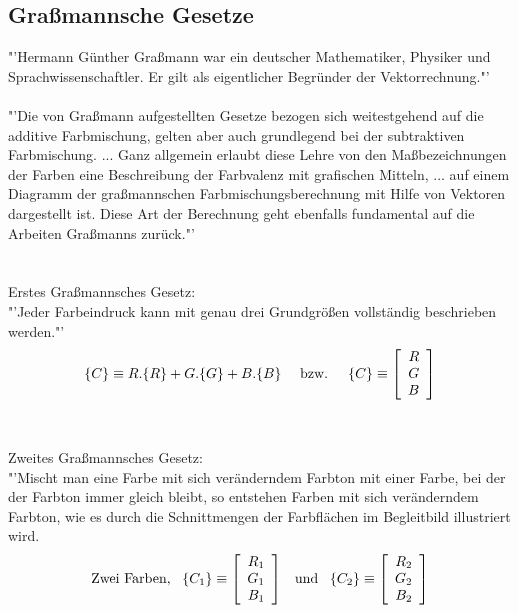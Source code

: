 \documentclass[11pt]{scrartcl}
\begin{document}
\subsection{Graßmannsche Gesetze}
"'Hermann Günther Graßmann war ein deutscher Mathematiker, Physiker und Sprachwissenschaftler. Er gilt als eigentlicher Begründer der
Vektorrechnung."'\\\cite{wikipediaGrassmann}\\
"'Die von Graßmann aufgestellten Gesetze bezogen sich weitestgehend auf die additive Farbmischung, gelten aber auch grundlegend bei der
subtraktiven Farbmischung. ... Ganz allgemein erlaubt diese Lehre von den Maßbezeichnungen der Farben eine Beschreibung der Farbvalenz
mit grafischen Mitteln, ... auf einem Diagramm der graßmannschen Farbmischungsberechnung mit Hilfe von Vektoren dargestellt ist. Diese
Art der Berechnung geht ebenfalls fundamental auf die Arbeiten Graßmanns zurück."'\\\cite{wikipediaGrassmannGestze}\\
\\
Erstes Graßmannsches Gesetz:\\
"'Jeder Farbeindruck kann mit genau drei Grundgrößen vollständig beschrieben werden."'
\begin{align}\label{Equ:2}
    \{C\} \equiv R.\{R\} + G.\{G\} + B.\{B\} \textrm{\hspace{1em} bzw. \hspace{1em}} \{C\} \equiv \left[ \begin{array}{r}
        R \\
        G \\
        B \\
    \end{array}\right]
\end{align}
\cite{wikipediaGrassmannGestze}\\
\\
Zweites Graßmannsches Gesetz:\\
"'Mischt man eine Farbe mit sich veränderndem Farbton mit einer Farbe, bei der der Farbton immer gleich bleibt, so entstehen Farben mit
sich veränderndem Farbton, wie es durch die Schnittmengen der Farbflächen im Begleitbild illustriert wird.
\begin{align}\label{Equ:3}
    \textrm{Zwei Farben, \hspace{.5em}} \{C_1\} \equiv \left[ \begin{array}{r}
        R_1 \\
        G_1 \\
        B_1 \\
    \end{array}\right]
    \textrm{\hspace{.5em} und \hspace{.5em}} \{C_2\} \equiv \left[ \begin{array}{r}
        R_2 \\
        G_2 \\
        B_2 \\
    \end{array}\right]
\end{align}
\end{document}
